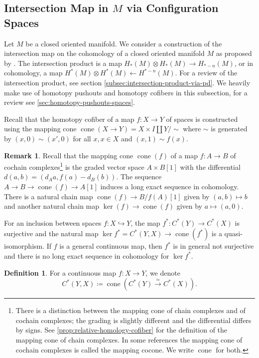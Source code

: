 \documentclass{scrartcl}
\theoremstyle{plain}
\theoremstyle{definition}
\newtheorem{definition}[theorem]{Definition}
\newtheorem{remark}[theorem]{Remark}
\DeclareMathOperator{\cone}{cone}
\newcommand{\quiso}{\simeq}
\newcommand{\defeq}{\coloneqq}
\newcommand{\from}{\leftarrow}
\let\xto\xrightarrow
\newcommand{\injto}{\hookrightarrow}
\renewcommand{\coprod}{\mathbin{\amalg}}
\begin{document}
\subsection[Intersection Map via Configuration Spaces]{Intersection Map in $M$ via Configuration Spaces}\label{subsec:intersection-in-M-via-conf}

Let $M$ be a closed oriented manifold. We consider a construction of the intersection map on the cohomology of a closed oriented manifold $M$ as proposed by \cite{naef2019string}. The intersection product is a map $H_*(M) \otimes H_*(M) \to H_{*-n}(M)$, or in cohomology, a map $H^*(M) \otimes H^*(M) \from H^{*-n}(M)$. For a review of the intersection product, see section \ref{subsec:intersection-product-via-pd}. We heavily make use of homotopy pushouts and homotopy cofibers in this subsection, for a review see \cref{sec:homotopy-pushouts-spaces}. 

Recall that the homotopy cofiber of a map $f\colon X\to Y$ of spaces is constructed using the mapping cone $\cone(X\to Y) = X\times I\coprod Y / \sim$ where $\sim$ is generated by $(x, 0)\sim (x', 0)$ for all $x, x\in X$ and $(x, 1)\sim f(x)$.

\begin{remark}\label{rmk:cofib-relative-homology}
    Recall that the mapping cone $\cone(f)$ of a map $f\colon A\to B$ of cochain complexes\footnote{There is a distinction between the mapping cone of chain complexes and of cochain complexes; the grading is slightly different and the differential differs by signs. See \cref{prop:relative-homology-cofiber} for the definition of the mapping cone of chain complexes. In some references the mapping cone of cochain complexes is called the mapping cocone. We write $\cone$ for both. } is the graded vector space $A\times B[1]$ with the differential $d(a, b) = (d_A a, f(a) - d_B(b))$. The sequence $A\to B\to \cone(f)\to A[1]$ induces a long exact sequence in cohomology. There is a natural chain map  $\cone(f) \to B/f(A)[1]$ given by $(a,b)\mapsto b$ and another natural chain map $\ker(f)\to \cone(f)$ given by $a\mapsto (a, 0)$. 
\end{remark}

    For an inclusion between spaces $f\colon X\injto Y$, the map $f^*\colon C^*(Y)\to C^*(X)$ is surjective and the natural map $\ker f^* = C^*(Y, X)\to \cone(f^*)$ is a quasi-isomorphism. If $f$ is a general continuous map, then $f^*$ is in general not surjective and there is no long exact sequence in cohomology for $\ker f^*$.
    \begin{definition}\label{notation:relative-mapping-cone}
        For a continuous map $f\colon X\to Y$, we denote $$C^*(Y, X) \defeq \cone(C^*(Y)\xto{\quiso} C^*(X)).$$
    \end{definition} 
\end{document}
